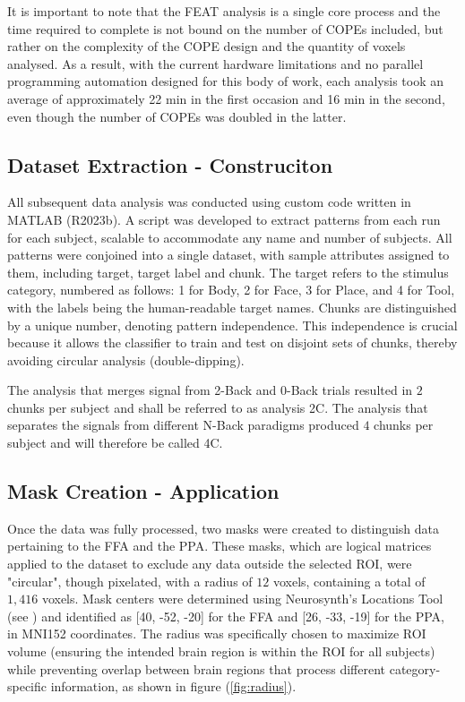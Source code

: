 It is important to note that the \acrshort{FEAT} analysis is a single core process and the time required to complete is not bound on the number of \gls{COPE}s included, but rather on the complexity of the \gls{COPE} design and the quantity of voxels analysed. As a result, with the current hardware limitations and no parallel programming automation designed for this body of work, each analysis took an average of approximately 22 \si{\minute} in the first occasion and 16 \si{\minute} in the second, even though the number of \gls{COPE}s was doubled in the latter.

\subsection{Dataset Extraction - Construciton}

All subsequent data analysis was conducted using custom code written in MATLAB (R2023b). A script was developed to extract patterns from each run for each subject, scalable to accommodate any name and number of subjects. All patterns were conjoined into a single dataset, with sample attributes assigned to them, including target, target label and chunk. The target refers to the stimulus category, numbered as follows: 1 for Body, 2 for Face, 3 for Place, and 4 for Tool, with the labels being the human-readable target names. Chunks are distinguished by a unique number, denoting pattern independence. This independence is crucial because it allows the classifier to train and test on disjoint sets of chunks, thereby avoiding circular analysis (double-dipping).

The analysis that merges signal from 2-Back and 0-Back trials resulted in $2$ chunks per subject and shall be referred to as analysis \gls{2C}. The analysis that separates the signals from different N-Back paradigms produced $4$ chunks per subject and will therefore be called \gls{4C}.

\subsection{Mask Creation - Application}

Once the data was fully processed, two masks were created to distinguish data pertaining to the \gls{FFA} and the \gls{PPA}. These masks, which are logical matrices applied to the dataset to exclude any data outside the selected \gls{ROI}, were "circular", though pixelated, with a radius of $12$ voxels, containing a total of $1,416$ voxels. Mask centers were determined using Neurosynth's Locations Tool (see \cite{neurosynth}) and identified as [40, -52, -20] for the \gls{FFA} and [26, -33, -19] for the \gls{PPA}, in MNI152 coordinates. The radius was specifically chosen to maximize \gls{ROI} volume (ensuring the intended brain region is within the \gls{ROI} for all subjects) while preventing overlap between brain regions that process different category-specific information, as shown in figure (\autoref{fig:radius}).

